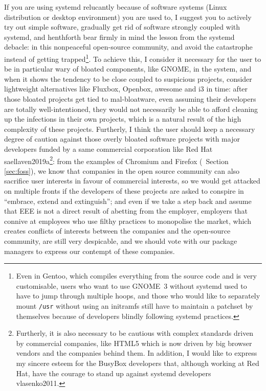 If you are using systemd relucantly because of software systems (Linux
distribution or desktop environment) you are used to, I suggest you to actively
try out simple software, gradually get rid of software strongly coupled with
systemd, and henthforth bear firmly in mind the lesson from the systemd debacle:
in this nonpeaceful open-source community,  and avoid the catastrophe instead of getting
trapped\footnote{Even in Gentoo, which compiles everything from the source code
and is very customisable, users who want to use GNOME~3 without systemd used to
have to jump through multiple hoops, and those who would
like to separately mount \texttt{/usr} without using an initramfs still have to
maintain a patchset by themselves because of developers
blindly following systemd practices.}.  To achieve
this, I consider it necessary for the user to be in particular wary of bloated
components, like GNOME, in the system, and when it shows the tendency to be
close coupled to suspicious projects, consider lightweight alternatives like
Fluxbox, Openbox, awesome and i3 in time: after those bloated projects get tied
to mal-bloatware, even assuming their developers are totally well-intentioned,
they would not necessarily be able to afford cleaning up the infections in
their own projects, which is a natural result of the
high complexity of these projects.  Furtherly, I think the user should keep a
necessary degree of caution against those overly bloated software projects with
major developers funded by a same commercial corporation like Red Hat\cupercite%
{saellaven2019a}\footnote{Furtherly, it is also necessary to be cautious with
complex standards driven by commercial companies, like HTML5 which is now driven
by big browser vendors and the companies behind them.  In addition, I would like
to express my sincere esteem for the BusyBox developers that, although working
at Red Hat, have the courage to stand up against systemd developers\cupercite%
{vlasenko2011}.}: from the examples of Chromium and Firefox (\cf~Section~%
\ref{sec:foss}), we know that companies in the open source community can also
sacrifice user interests in favour of commercial interests, so we would get
attacked on multiple fronts if the developers of these projects are asked to
conspire in ``embrace, extend and extinguish''; and even if we take a step
back and assume that EEE is not a direct result of abetting from the employer,
employers that connive at employees who use filthy practices to monopolise
the market, which creates conflicts of interests between the companies and
the open-source community, are still very despicable, and we should vote
with our package managers to express our contempt of these companies.

